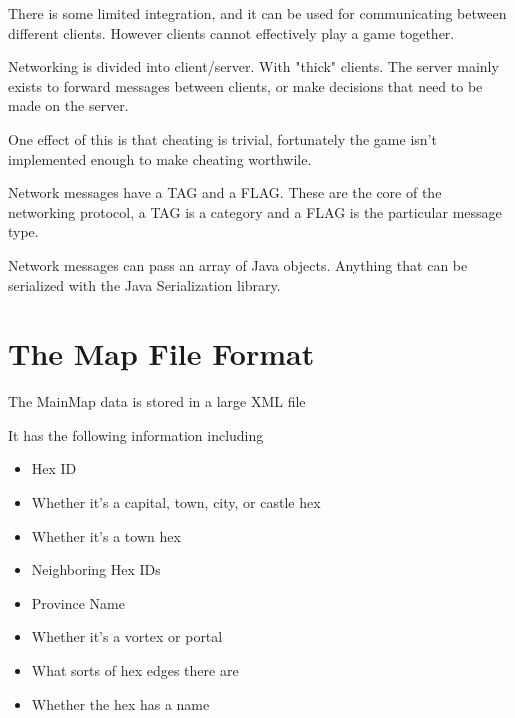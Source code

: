 \documentclass[12pt,a4paper]{article}
\begin{document}
There is some limited integration, and it can be used for communicating between
different clients. However clients cannot effectively play a game together.

Networking is divided into client/server. With "thick" clients. 
The server mainly exists to forward messages between clients, or make decisions
that need to be made on the server.

One effect of this is that cheating is trivial, fortunately the game isn't
implemented enough to make cheating worthwile.

Network messages have a TAG and a FLAG. These are the core of the networking
protocol, a TAG is a category and a FLAG is the particular message type.

Network messages can pass an array of Java objects. Anything that can be
serialized with the Java Serialization library.


\section{The Map File Format}
The MainMap data is stored in a large XML file

It has the following information including 

\begin{itemize}
\item{Hex ID}
\item{Whether it's a capital, town, city, or castle hex}
\item{Whether it's a town hex}
\item{Neighboring Hex IDs}
\item{Province Name}
\item{Whether it's a vortex or portal}
\item{What sorts of hex edges there are}
\item{Whether the hex has a name}
\end{itemize}

\end{document}
